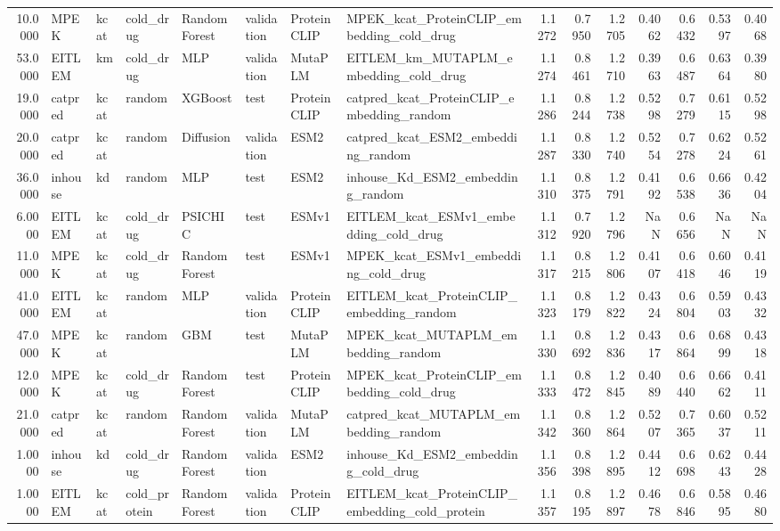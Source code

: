 \begin{tabular}{rlllllllrrrrrrr}
10.0000 & MPEK & kcat & cold_drug & Random Forest & validation & ProteinCLIP & MPEK_kcat_ProteinCLIP_embedding_cold_drug & 1.1272 & 0.7950 & 1.2705 & 0.4062 & 0.6432 & 0.5397 & 0.4068 \\
53.0000 & EITLEM & km & cold_drug & MLP & validation & MutaPLM & EITLEM_km_MUTAPLM_embedding_cold_drug & 1.1274 & 0.8461 & 1.2710 & 0.3963 & 0.6487 & 0.6364 & 0.3980 \\
19.0000 & catpred & kcat & random & XGBoost & test & ProteinCLIP & catpred_kcat_ProteinCLIP_embedding_random & 1.1286 & 0.8244 & 1.2738 & 0.5298 & 0.7279 & 0.6115 & 0.5298 \\
20.0000 & catpred & kcat & random & Diffusion & validation & ESM2 & catpred_kcat_ESM2_embedding_random & 1.1287 & 0.8330 & 1.2740 & 0.5254 & 0.7278 & 0.6224 & 0.5261 \\
36.0000 & inhouse & kd & random & MLP & test & ESM2 & inhouse_Kd_ESM2_embedding_random & 1.1310 & 0.8375 & 1.2791 & 0.4192 & 0.6538 & 0.6636 & 0.4204 \\
6.0000 & EITLEM & kcat & cold_drug & PSICHIC & test & ESMv1 & EITLEM_kcat_ESMv1_embedding_cold_drug & 1.1312 & 0.7920 & 1.2796 & NaN & 0.6656 & NaN & NaN \\
11.0000 & MPEK & kcat & cold_drug & Random Forest & test & ESMv1 & MPEK_kcat_ESMv1_embedding_cold_drug & 1.1317 & 0.8215 & 1.2806 & 0.4107 & 0.6418 & 0.6046 & 0.4119 \\
41.0000 & EITLEM & kcat & random & MLP & validation & ProteinCLIP & EITLEM_kcat_ProteinCLIP_embedding_random & 1.1323 & 0.8179 & 1.2822 & 0.4324 & 0.6804 & 0.5903 & 0.4332 \\
47.0000 & MPEK & kcat & random & GBM & test & MutaPLM & MPEK_kcat_MUTAPLM_embedding_random & 1.1330 & 0.8692 & 1.2836 & 0.4317 & 0.6864 & 0.6899 & 0.4318 \\
12.0000 & MPEK & kcat & cold_drug & Random Forest & test & ProteinCLIP & MPEK_kcat_ProteinCLIP_embedding_cold_drug & 1.1333 & 0.8472 & 1.2845 & 0.4089 & 0.6440 & 0.6662 & 0.4111 \\
21.0000 & catpred & kcat & random & Random Forest & validation & MutaPLM & catpred_kcat_MUTAPLM_embedding_random & 1.1342 & 0.8360 & 1.2864 & 0.5207 & 0.7365 & 0.6037 & 0.5211 \\
1.0000 & inhouse & kd & cold_drug & Random Forest & validation & ESM2 & inhouse_Kd_ESM2_embedding_cold_drug & 1.1356 & 0.8398 & 1.2895 & 0.4412 & 0.6698 & 0.6243 & 0.4428 \\
1.0000 & EITLEM & kcat & cold_protein & Random Forest & validation & ProteinCLIP & EITLEM_kcat_ProteinCLIP_embedding_cold_protein & 1.1357 & 0.8195 & 1.2897 & 0.4678 & 0.6846 & 0.5895 & 0.4680 \\

\end{tabular}
